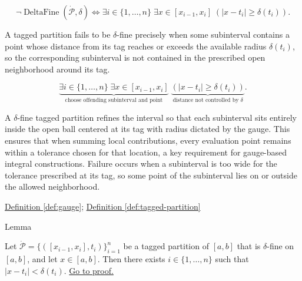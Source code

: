 \begin{remark*}
\[
\neg \operatorname{DeltaFine}(\dot{\mathcal{P}},\delta) \Longleftrightarrow \exists i \in \{1,\dots,n\}\;\exists x \in [x_{i-1},x_i]\;( |x-t_i|\ge \delta(t_i)).
\]
\end{remark*}

\begin{remark*}
A tagged partition fails to be $\delta$-fine precisely when some subinterval contains a point whose distance from its tag reaches or exceeds the available radius $\delta(t_i)$, so the corresponding subinterval is not contained in the prescribed open neighborhood around its tag.
\end{remark*}

\begin{remark*}
\[
\underbrace{\exists i \in \{1,\dots,n\}\;\exists x \in [x_{i-1},x_i]}_{\text{choose offending subinterval and point}}
\;\underbrace{(|x-t_i|\ge \delta(t_i))}_{\text{distance not controlled by }\delta}.
\]
\end{remark*}

\begin{remark*}[Interpretation]
A $\delta$-fine tagged partition refines the interval so that each subinterval sits entirely inside the open ball centered at its tag with radius dictated by the gauge. This ensures that when summing local contributions, every evaluation point remains within a tolerance chosen for that location, a key requirement for gauge-based integral constructions. Failure occurs when a subinterval is too wide for the tolerance prescribed at its tag, so some point of the subinterval lies on or outside the allowed neighborhood.
\end{remark*}

\begin{dependencies}
\hyperref[def:gauge]{Definition \ref*{def:gauge}}; \hyperref[def:tagged-partition]{Definition \ref*{def:tagged-partition}}
\end{dependencies}


\begin{lemmabox}{Lemma}
\begin{lemma}
\label{lem:every-point-covered-by-tag}
Let $\dot{\mathcal{P}}=\{([x_{i-1},x_i],t_i)\}_{i=1}^n$ be a tagged partition of $[a,b]$ that is $\delta$-fine on $[a,b]$, and let $x\in[a,b]$. Then there exists $i\in\{1,\ldots,n\}$ such that $|x-t_i|<\delta(t_i)$.
\hyperref[prf:every-point-covered-by-tag]{Go to proof.}
\end{lemma}
\end{lemmabox}


